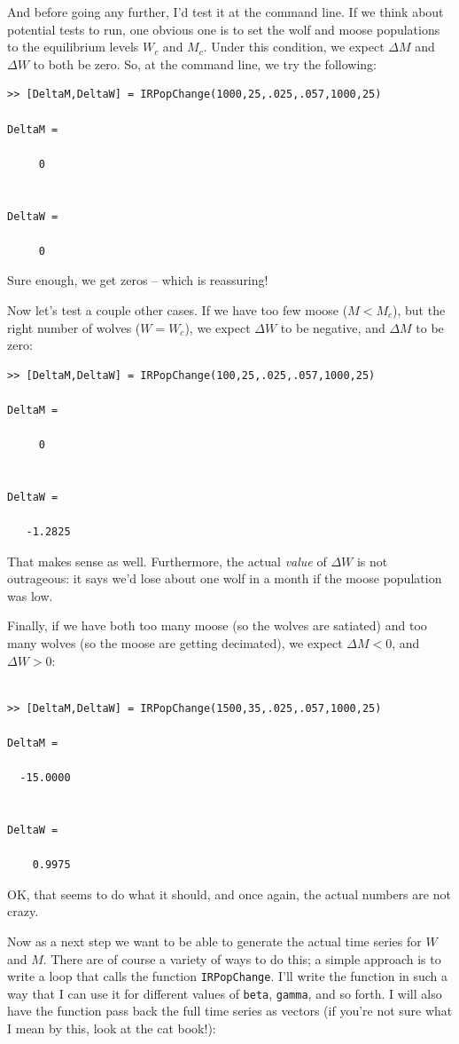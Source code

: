 And before going any further, I'd test it at the command line.  If we think about potential tests to run, one obvious one is to set the wolf and moose populations to the equilibrium levels $W_c$ and $M_c$.  Under this condition, we expect $\Delta M$ and $\Delta W$ to both be zero.  So, at the command line, we try the following:

\begin{verbatim}
>> [DeltaM,DeltaW] = IRPopChange(1000,25,.025,.057,1000,25)

DeltaM =

     0


DeltaW =

     0

\end{verbatim}

Sure enough, we get zeros -- which is reassuring!

Now let's test a couple other cases.  If we have too few moose ($M<M_c$), but the right number of wolves ($W=W_c$), we expect $\Delta W$ to be negative, and $\Delta M$ to be zero:

\begin{verbatim}
>> [DeltaM,DeltaW] = IRPopChange(100,25,.025,.057,1000,25)

DeltaM =

     0


DeltaW =

   -1.2825
\end{verbatim}
That makes sense as well.  Furthermore, the actual {\it value} of $\Delta W$ is not outrageous:  it says we'd lose about one wolf in a month if the moose population was low.  

Finally, if we have both too many moose (so the wolves are satiated) and too many wolves (so the moose are getting decimated), we expect $\Delta M<0$, and $\Delta W>0$:

 \begin{verbatim}

>> [DeltaM,DeltaW] = IRPopChange(1500,35,.025,.057,1000,25)

DeltaM =

  -15.0000


DeltaW =

    0.9975
\end{verbatim}

OK, that seems to do what it should, and once again, the actual numbers are not crazy.

Now as a next step we want to be able to generate the actual time series for $W$ and $M$.  There are of course a variety of ways to do this; a simple approach is to write a loop that calls the function {\tt IRPopChange}.  I'll write the function in such a way that I can use it for different values of {\tt beta}, {\tt gamma}, and so forth.  I will also have the function pass back the full time series as vectors (if you're not sure what I mean by this, look at the cat book!):

